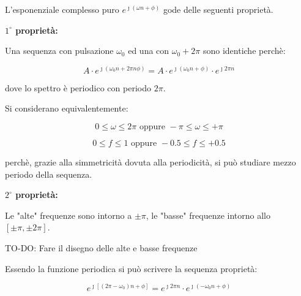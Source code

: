 L'esponenziale complesso puro $e^{\jmath \left( \omega n + \phi\right)}$ gode delle seguenti proprietà. \newline 

\textbf{$1^{\circ}$ proprietà: } \newline 

Una sequenza con pulsazione $\omega_0$ ed una con $\omega_0 + 2 \pi$ sono identiche perchè: 

{
    \Large 
    \begin{equation}
        A \cdot e^{\jmath \left( \omega_0 n + 2 \pi n \phi\right)}
        = 
        A \cdot e^{\jmath \left( \omega_0 n + \phi\right)} \cdot e^{\jmath 2 \pi n} 
    \end{equation}
}

dove lo spettro è periodico con periodo $2 \pi$. \newline 

Si considerano equivalentemente: 

{
    \Large 
    \begin{equation}
        0 \leq \omega \leq 2 \pi 
        \text{ oppure }
        - \pi \leq \omega \leq + \pi
    \end{equation}
}

{
    \Large 
    \begin{equation}
        0 \leq f \leq 1 
        \text{ oppure }
        -0.5 \leq f \leq +0.5
    \end{equation}
}

perchè, grazie alla simmetricità dovuta alla periodicità, 
si può studiare mezzo periodo della sequenza. \newline 

\textbf{$2^{\circ}$ proprietà: } \newline 

Le "alte" frequenze sono intorno a $\pm \pi$, le "basse" frequenze intorno allo $[\pm \pi, \pm 2 \pi]$. \newline 

\begin{tcolorbox}[colback=green!5!white,colframe=green!75!black]
TO-DO: Fare il disegno delle alte e basse frequenze
\end{tcolorbox} 

Essendo la funzione periodica si può scrivere la sequenza proprietà: 

{
    \Large 
    \begin{equation}
        e^{\jmath \left[ \left( 2 \pi - \omega_0\right) n + \phi\right]}
        = 
        e^{\jmath 2 \pi n} \cdot e^{\jmath \left( - \omega_0 n + \phi\right)}
    \end{equation}
}

